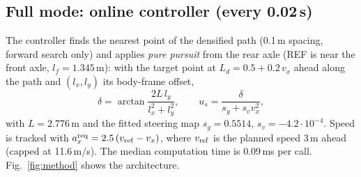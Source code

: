 \documentclass[conference]{IEEEtran}
\begin{document}
\subsection{Full mode: online controller (every 0.02\,s)}
The controller finds the nearest point of the densified path (0.1\,m spacing,
forward search only) and applies \emph{pure pursuit} from the rear axle
(REF is near the front axle, $l_f=1.345$\,m): with the target point at
$L_d=0.5+0.2\,v_x$ ahead along the path and $(l_x,l_y)$ its body-frame offset,
\begin{equation}
\delta=\arctan\frac{2L\,l_y}{l_x^2+l_y^2},\qquad
u_s=\frac{\delta}{s_g+s_v v_x^2},
\end{equation}
with $L=2.776$\,m and the fitted steering map $s_g=0.5514$,
$s_v=-4.2\cdot10^{-4}$. Speed is tracked with
$a_x^{\rm req}=2.5\,(v_{\rm ref}-v_x)$, where $v_{\rm ref}$ is the planned
speed 3\,m ahead (capped at 11.6\,m/s). The median computation time is
0.09\,ms per call. Fig.~\ref{fig:method} shows the architecture.
\end{document}
